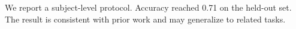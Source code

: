 
We report a subject-level protocol. Accuracy reached 0.71 on the held-out set.
The result is consistent with prior work and may generalize to related tasks.

